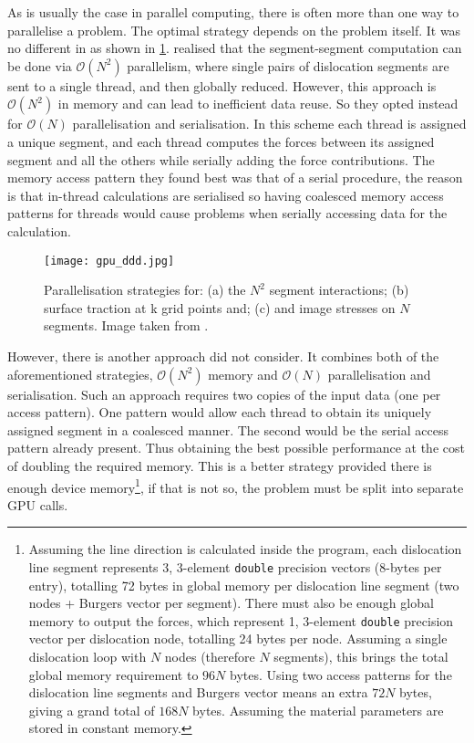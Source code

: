 As is usually the case in parallel computing, there is often more than one way to parallelise a problem. The optimal strategy depends on the problem itself. It was no different in \cite{gpu_ddd} as shown in \cref{f:gpu_ddd}.  realised that the segment-segment computation can be done via $ \mathcal{O}(N^{2}) $ parallelism, where single pairs of dislocation segments are sent to a single thread, and then globally reduced. However, this approach is $ \mathcal{O}(N^{2}) $ in memory and can lead to inefficient data reuse. So they opted instead for $ \mathcal{O}(N) $ parallelisation and serialisation. In this scheme each thread is assigned a unique segment, and each thread computes the forces between its assigned segment and all the others while serially adding the force contributions. The memory access pattern they found best was that of a serial procedure, the reason is that in-thread calculations are serialised so having coalesced memory access patterns for threads would cause problems when serially accessing data for the calculation.
\begin{figure}[t]
  \centering
  \texttt{[image: gpu\_ddd.jpg]}
  \caption[Parallelisation strategies for three problems in 3D DDD.]{Parallelisation strategies for: (a) the $ N^{2} $ segment interactions; (b) surface traction at k grid points and; (c) and image stresses on $ N $ segments. Image taken from \cite{gpu_ddd}.}
  \label{f:gpu_ddd}
\end{figure}

However, there is another approach \citet{gpu_ddd} did not consider. It combines both of the aforementioned strategies, $ \mathcal{O}(N^{2}) $ memory and $ \mathcal{O}(N) $ parallelisation and serialisation. Such an approach requires two copies of the input data (one per access pattern). One pattern would allow each thread to obtain its uniquely assigned segment in a coalesced manner. The second would be the serial access pattern already present. Thus obtaining the best possible performance at the cost of doubling the required memory. This is a better strategy provided there is enough device memory\footnote{Assuming the line direction is calculated inside the program, each dislocation line segment represents 3, 3-element \texttt{double} precision vectors (8-bytes per entry), totalling 72 bytes in global memory per dislocation line segment (two nodes + Burgers vector per segment). There must also be enough global memory to output the forces, which represent 1, 3-element \texttt{double} precision vector per dislocation node, totalling 24 bytes per node. Assuming a single dislocation loop with $ N $ nodes (therefore $ N $ segments), this brings the total global memory requirement to $ 96N $ bytes. Using two access patterns for the dislocation line segments and Burgers vector means an extra $ 72N $ bytes, giving a grand total of $ 168N $ bytes. Assuming the material parameters are stored in constant memory.}, if that is not so, the problem must be split into separate GPU calls.

